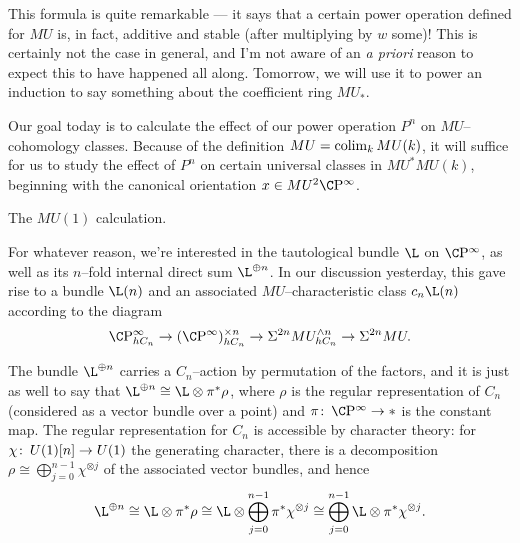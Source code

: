 This formula is quite remarkable --- it says that a certain power operation defined for $MU$ is, in fact, additive and stable (after multiplying by $w$ some)!  This is certainly not the case in general, and I'm not aware of an \textit{a priori} reason to expect this to have happened all along.  Tomorrow, we will use it to power an induction to say something about the coefficient ring $MU_*$.






Our goal today is to calculate the effect of our power operation $P^n$ on $MU$--cohomology classes.  Because of the definition $MU = \operatorname*{colim}_k MU(k)$, it will suffice for us to study the effect of $P^n$ on certain universal classes in $MU^* MU(k)$, beginning with the canonical orientation $x \in MU^2 \CP^\infty$.




The $MU(1)$ calculation.

For whatever reason, we're interested in the tautological bundle $\L$ on $\CP^\infty$, as well as its $n$--fold internal direct sum $\L^{\oplus n}$.  In our discussion yesterday, this gave rise to a bundle $\L(n)$ and an associated $MU$--characteristic class $c_n \L(n)$ according to the diagram \[\CP^\infty_{hC_n} \to (\CP^\infty)^{\times n}_{hC_n} \to \Susp^{2n} MU^{\sm n}_{hC_n} \to \Susp^{2n} MU.\]

The bundle $\L^{\oplus n}$ carries a $C_n$--action by permutation of the factors, and it is just as well to say that $\L^{\oplus n} \cong \L \otimes \pi^* \rho$, where $\rho$ is the regular representation of $C_n$ (considered as a vector bundle over a point) and $\pi\co \CP^\infty \to *$ is the constant map.  The regular representation for $C_n$ is accessible by character theory: for $\chi\colon\thinspace U(1)[n] \to U(1)$ the generating character, there is a decomposition $\rho \cong \bigoplus_{j=0}^{n-1} \chi^{\otimes j}$ of the associated vector bundles, and hence \[\L^{\oplus n} \cong \L \otimes \pi^* \rho \cong \L \otimes \bigoplus_{j=0}^{n-1} \pi^* \chi^{\otimes j} \cong \bigoplus_{j=0}^{n-1} \L \otimes \pi^* \chi^{\otimes j}.\]

